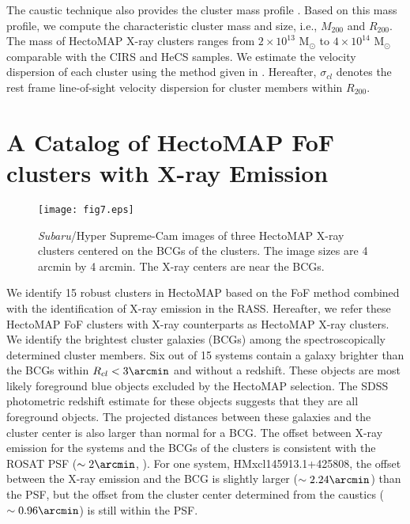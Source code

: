 \documentclass[iop, apj]{emulateapj}
\begin{document}
The caustic technique also provides the cluster mass profile
 \citep{Diaferio97, Diaferio99b, Serra11}. 
Based on this mass profile, 
 we compute the characteristic cluster mass and size, 
 i.e., $M_{200}$ and $R_{200}$. 
The mass of HectoMAP X-ray clusters ranges from 
 $2 \times 10^{13}$ M$_{\odot}$ to $4 \times 10^{14}$ M$_{\odot}$
 comparable with the CIRS \citep{Rines06} and HeCS \citep{Rines13} samples. 
We estimate the velocity dispersion of each cluster
 using the method given in \citet{Danese80}. 
Hereafter, $\sigma_{cl}$ denotes the rest frame line-of-sight velocity dispersion 
 for cluster members within $R_{200}$. 



\section{A Catalog of HectoMAP FoF clusters with X-ray Emission}\label{cat}

\begin{figure*}
\centering
\texttt{[image: fig7.eps]}
\caption{
{\it Subaru}/Hyper Supreme-Cam images of three HectoMAP X-ray clusters centered on the BCGs of the clusters.
The image sizes are 4 arcmin by 4 arcmin. 
The X-ray centers are near the BCGs. } 
\label{hsc}
\end{figure*}

We identify 15 robust clusters in HectoMAP 
 based on the FoF method combined with the identification of X-ray emission in the RASS. 
Hereafter, we refer these HectoMAP FoF clusters with X-ray counterparts 
 as HectoMAP X-ray clusters.
We identify the brightest cluster galaxies (BCGs) among 
 the spectroscopically determined cluster members. 
Six out of 15 systems contain a galaxy brighter than the BCGs within $R_{cl} < 3\arcmin$ and without a redshift. 
These objects are most likely foreground blue objects excluded by the HectoMAP selection.
The SDSS photometric redshift estimate for these objects suggests that they are all foreground objects. 
The projected distances between these galaxies and the cluster center is also larger 
 than normal for a BCG.
The offset between X-ray emission for the systems and the BCGs of the clusters 
 is consistent with the ROSAT PSF ($\sim 2\arcmin$, \citealp{Boese00}).
For one system, HMxcl145913.1+425808, 
 the offset between the X-ray emission and the BCG is slightly larger ($\sim 2.24\arcmin$) than the PSF, 
 but the offset from the cluster center determined from the caustics ($\sim 0.96\arcmin$) is still within the PSF.  
\end{document}
